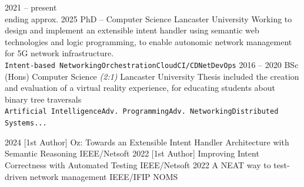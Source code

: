 \documentclass[9pt]{developercv} %
\begin{document}
\begin{entrylist}
	\entry
	{2021 -- present\\\footnotesize{ending approx. 2025}}
	{PhD -- Computer Science}
	{Lancaster University}
	{Working to design and implement an extensible intent handler using semantic
	web technologies and logic programming, to enable autonomic network
	management for 5G network infrastructure.
	\\\texttt{Intent-based
	Networking}\slashsep\texttt{Orchestration}\slashsep\texttt{Cloud}\slashsep\texttt{CI/CD}\slashsep\texttt{NetDevOps}}
	\entry
	{2016 -- 2020}
	{BSc (Hons) Computer Science \textit{(2:1)}}
	{Lancaster University}
	{Thesis included the creation and evaluation of a virtual reality
	experience, for educating students about binary tree traversals
	\\\texttt{Artificial Intelligence}\slashsep\texttt{Adv.
			Programming}\slashsep\texttt{Adv. Networking}\slashsep\texttt{Distributed Systems}\slashsep\texttt{...}}
\end{entrylist}


\vspace{-1em}

\begin{entrylist}
	\pubentry
	{2024}
	{[1st Author]}
	{Oz: Towards an Extensible Intent Handler Architecture with Semantic
	Reasoning}
	{IEEE/Netsoft}
	\pubentry
	{2022}
	{[1st Author]}
	{Improving Intent Correctness with Automated Testing}
	{IEEE/Netsoft}
	\pubentry
	{2022}
	{}
	{A NEAT way to test-driven network management}
	{IEEE/IFIP NOMS}
\end{entrylist}

\end{document}
